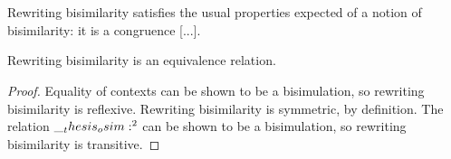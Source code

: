 



\section{}

Rewriting bisimilarity satisfies the usual properties expected of a notion of bisimilarity: it is a congruence [...].
%
\begin{theorem}
  Rewriting bisimilarity is an equivalence relation.
\end{theorem}
\begin{proof}
  Equality of contexts can be shown to be a bisimulation, so rewriting bisimilarity is reflexive.
  Rewriting bisimilarity is symmetric, by definition.
  The relation $\__thesis_osim:^2$ can be shown to be a bisimulation, so rewriting bisimilarity is transitive.
\end{proof}



